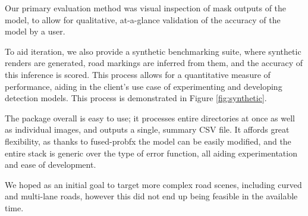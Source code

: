 \documentclass[conference]{IEEEtran}
\begin{document}
Our primary evaluation method was visual inspection of mask outputs of the model, to allow for qualitative, at-a-glance validation of the accuracy of the model by a user.

To aid iteration, we also provide a synthetic benchmarking suite, where synthetic renders are generated, road markings are inferred from them, and the accuracy of this inference is scored. This process allows for a quantitative measure of performance, aiding in the client's use case of experimenting and developing detection models. This process is demonstrated in Figure \ref{fig:synthetic}.

The package overall is easy to use; it processes entire directories at once as well as individual images, and outputs a single, summary CSV file. It affords great flexibility, as thanks to fused-probfx the model can be easily modified, and the entire stack is generic over the type of error function, all aiding experimentation and ease of development.

We hoped as an initial goal to target more complex road scenes, including curved and multi-lane roads, however this did not end up being feasible in the available time.
\end{document}
